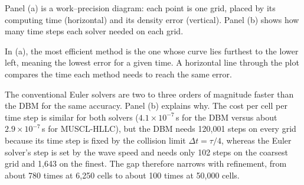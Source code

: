 \begin{figexplain}{}
\begin{fx}
\item[What is shown.] Panel (a) is a work--precision diagram: each point is one grid, placed by
  its computing time (horizontal) and its density error (vertical).  Panel (b) shows how many
  time steps each solver needed on each grid.
\item[How to read it.] In (a), the most efficient method is the one whose curve lies furthest to
  the lower left, meaning the lowest error for a given time.  A horizontal line through the
  plot compares the time each method needs to reach the same error.
\item[What it means.] The conventional Euler solvers are two to three orders of magnitude
  faster than the DBM for the same accuracy.  Panel (b) explains why.  The cost per cell per
  time step is similar for both solvers ($4.1\times10^{-7}$\,s for the DBM versus about
  $2.9\times10^{-7}$\,s for MUSCL-HLLC), but the DBM needs 120{,}001 steps on every grid
  because its time step is fixed by the collision limit $\Delta t = \tau/4$, whereas the Euler
  solver's step is set by the wave speed and needs only 102 steps on the coarsest grid and
  1{,}643 on the finest.  The gap therefore narrows with refinement, from about 780 times at
  6{,}250 cells to about 100 times at 50{,}000 cells.
\end{fx}
\end{figexplain}

